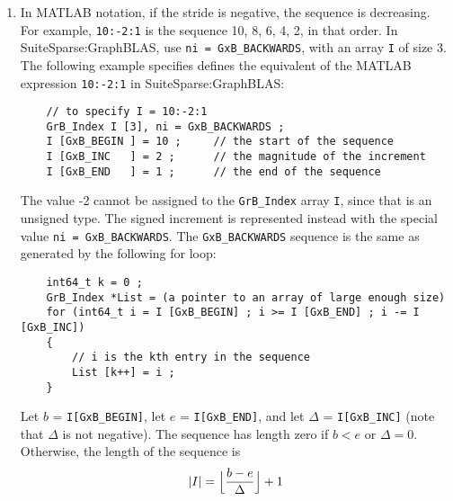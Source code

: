 \documentclass[12pt]{article}
\begin{document}
{\begin{enumerate}
    \vspace{-0.05in}
    Then passing the explicit array \verb'List' and its length \verb'ni=k' has
    the same effect as passing in the array \verb'I' of size 3, with
    \verb'ni=GxB_STRIDE'.  The latter is simply much faster to produce, and
    much more efficient for SuiteSparse:GraphBLAS to process.

    Let $b$ = \verb'I[GxB_BEGIN]', let $e$ = \verb'I[GxB_END]', and let
    $\Delta$ = \verb'I[GxB_INC]'.  The sequence has length zero if $b > e$ or
    $\Delta=0$.  Otherwise, the length of the sequence is
    \[
    |I| = \Bigl\lfloor\dfrac{e-b}{\Delta}\Bigr\rfloor + 1
    \]

\item
    In MATLAB notation, if the stride is negative, the sequence is decreasing.
    For example, \verb'10:-2:1' is the sequence 10, 8, 6, 4, 2, in that order.
    In SuiteSparse:GraphBLAS, use \verb'ni = GxB_BACKWARDS', with an array
    \verb'I' of size 3.  The following example specifies defines the equivalent
    of the MATLAB expression \verb'10:-2:1' in SuiteSparse:GraphBLAS:

    \vspace{-0.1in}
    {\footnotesize
    \begin{verbatim}
    // to specify I = 10:-2:1
    GrB_Index I [3], ni = GxB_BACKWARDS ;
    I [GxB_BEGIN ] = 10 ;     // the start of the sequence
    I [GxB_INC   ] = 2 ;      // the magnitude of the increment
    I [GxB_END   ] = 1 ;      // the end of the sequence \end{verbatim}}

    \vspace{-0.1in}
    The value -2 cannot be assigned to the \verb'GrB_Index' array \verb'I',
    since that is an unsigned type.  The signed increment is represented
    instead with the special value \verb'ni = GxB_BACKWARDS'.
    The \verb'GxB_BACKWARDS' sequence is the same as generated by the following
    for loop:

    \vspace{-0.1in}
    {\footnotesize
    \begin{verbatim}
    int64_t k = 0 ;
    GrB_Index *List = (a pointer to an array of large enough size)
    for (int64_t i = I [GxB_BEGIN] ; i >= I [GxB_END] ; i -= I [GxB_INC])
    {
        // i is the kth entry in the sequence
        List [k++] = i ;
    } \end{verbatim}}

    \vspace{-0.1in}
    Let $b$ = \verb'I[GxB_BEGIN]', let $e$ = \verb'I[GxB_END]', and let
    $\Delta$ = \verb'I[GxB_INC]' (note that $\Delta$ is not negative).  The
    sequence has length zero if $b < e$ or $\Delta=0$.  Otherwise, the length
    of the sequence is
    \[
    |I| = \Bigl\lfloor\dfrac{b-e}{\Delta}\Bigr\rfloor + 1
    \]


\end{enumerate}}
\end{document}
